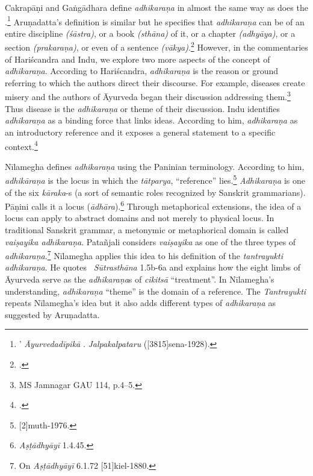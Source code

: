 Cakrapāṇi and Gaṅgādhara define \emph{adhikaraṇa} in almost the same way as does the \SS.\footnote{’  \emph{Āyurvedadīpikā} \parencite[736]{cara-trikamji3}.  \emph{Jalpakalpataru} ([3815]{sena-1928}).}
Aruṇadatta's definition is similar but he specifies that \emph{adhikaraṇa} can be of an entire discipline \emph{(śāstra)}, or a book \emph{(sthāna)} of it, or a chapter \emph{(adhyāya)}, or a section \emph{(prakaraṇa)}, or even of a sentence \emph{(vākya)}.\footnote{ \parencite[947]{kunt-1939}.} 
However, in the commentaries of Hariścandra and Indu, we explore two more aspects of the concept of \emph{adhikaraṇa}. According to Hariścandra, \emph{adhikaraṇa} is the reason or ground referring to which the authors direct their discourse. For example, diseases create misery and the authors of Āyurveda began their discussion addressing them.\footnote{ MS Jamnagar GAU 114, p.4--5.}
Thus disease is the \emph{adhikaraṇa} or theme of their discussion. Indu identifies \emph{adhikaraṇa} as a binding force that links ideas. According to him, \emph{adhikaraṇa} as an introductory reference and it exposes a general statement to a specific context.\footnote{ \parencite[959]{atha-1980}.} 

Nīlamegha defines \emph{adhikaraṇa} using the Paninian terminology. 
According to him, \emph{adhikāraṇa} is the locus in which the \emph{tātparya}, “reference” lies.\footnote{ \cite{1}[2]{muth-1976}.} 
\emph{Adhikaraṇa} is one of the six \emph{kāraka}-s (a sort of semantic roles recognized by Sanskrit grammarians). 
Pāṇini calls it a locus (\emph{ādhāra}).\footnote{ \emph{Aṣṭādhyāyī} 1.4.45.} 
Through metaphorical extensions, the idea of a locus can apply to abstract domains and not merely to physical locus. 
In traditional Sanskrit grammar, a metonymic or metaphorical domain is called \emph{vaiṣayika adhikaraṇa}. 
Patañjali considers \emph{vaiṣayika} as one of the three types of \emph{adhikaraṇa}.\footnote{On \emph{Aṣṭādhyāyī} 6.1.72 [51]{kiel-1880}.} 
Nīlamegha applies this idea to his definition of the \emph{tantrayukti} \emph{adhikaraṇa}. 
He quotes \AHS\ \emph{Sūtrasthāna} 1.5b-6a and explains how the eight limbs of Āyurveda serve as the \emph{adhikaraṇa}s of \emph{cikitsā} “treatment”. 
In Nīlamegha's understanding, \emph{adhikaraṇa} “theme” is the domain of a reference. 
The \emph{Tantrayukti} repeats Nīlamegha's idea but it also adds different types of \emph{adhikaraṇa} as suggested by Aruṇadatta. 

